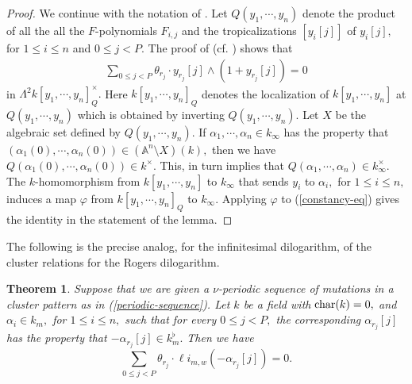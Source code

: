 \documentclass{amsart}
\newtheorem{theorem}{Theorem}[subsection]
\theoremstyle{definition}
\numberwithin{equation}{subsection}
\begin{document}
\begin{proof}
We continue with the notation of \cite[]{nak}. 
Let $Q(y_{1},\cdots, y_{n})$ denote the product of all the 
all the $F$-polynomials $F_{i,j}$ and the tropicalizations $[y_{i}[j]]$ of $y_{i}[j],$  for $1 \leq i \leq n$ and $0 \leq j <P.$ The proof of 
\cite[Proposition 3.13]{nak} (cf. \cite[Proposition 6.7]{nak-per}) shows that  
\begin{align}\label{constancy-eq}
 \sum _{0\leq j<P}\theta_{r_j}\cdot y_{r_j}[j]\wedge (1+y_{r_j}[j])=0   
\end{align}
in $\Lambda ^2 k[y_1,\cdots,y_n]_{Q} ^{\times}.$  Here $k[y_1,\cdots,y_n]_{Q}$ denotes the localization of $k[y_1,\cdots,y_n]$ at $Q(y_{1},\cdots,y_n)$ which is obtained by inverting $Q(y_{1}, \cdots, y_{n}).$  Let $X$ be the algebraic set defined by $Q(y_{1},\cdots,y_{n}).$ If  ${\alpha}_{1}, \cdots, {\alpha}_{n} \in  k_{\infty}$ has the property that $({\alpha}_{1}(0), \cdots, {\alpha} _{n} (0)) \in (\mathbb{A}^n \setminus X)(k),$ then we have $Q({\alpha}_{1}(0), \cdots, {\alpha} _{n} (0)) \in k^{\times }.$ This, in turn implies that $Q({\alpha}_{1}, \cdots, {\alpha} _{n} ) \in k_{\infty}^{\times }.$ The $k$-homomorphism from $k[y_{1}, \cdots, y_{n}]$ to $k_{\infty}$ that sends $y_{i}$ to ${\alpha}_{i},$ for $1 \leq i \leq n,$ induces a map $\varphi$ from $k[y_{1},\cdots, y_{n}]_{Q}$ to $k_{\infty}.$
Applying $\varphi$ to (\ref{constancy-eq}) gives the identity in the statement of the lemma. 
 \end{proof}
The following is the precise analog, for the infinitesimal dilogarithm,  of the cluster relations for the Rogers dilogarithm. 

\begin{theorem}\label{theorem-0-identity} Suppose that we are given a $\nu$-periodic sequence of mutations in a cluster pattern as in (\ref{periodic-sequence}). Let  $k$ be a field with ${\rm char}(k)=0,$   and  $\alpha_i \in k_{m} ,$ for $1\leq i \leq n,$ such that   for every $0 \leq j <P,$ the corresponding $\alpha _{r_j}[j]$ has the property that $-\alpha_{r_j}[j]  \in k_{m} ^{\flat}.$  Then  we have  
$$
\sum _{0\leq j <P} \theta_{r_j}\cdot \ell i _{m,w}(-\alpha_{r_j}[j])=0.
 $$

    
\end{theorem}
\end{document}
